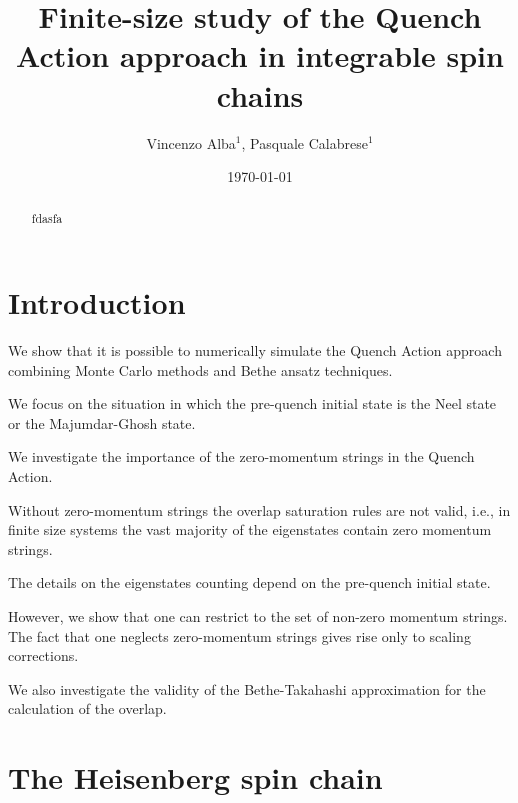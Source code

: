 \documentclass[11pt]{iopart}
\begin{document}
\setlength{\parindent}{0pt}


\title{Finite-size study of the Quench Action approach in integrable spin 
chains}

\author{Vincenzo Alba$^1$, Pasquale Calabrese$^1$}
\address{$^1$ International School for Advanced Studies (SISSA),
Via Bonomea 265, 34136, Trieste, Italy,
INFN, Sezione di Trieste}


\date{\today}



\begin{abstract} 


fdasfa
\end{abstract}

\maketitle

\section{Introduction}
\label{intro}

We show that it is possible to numerically simulate the Quench Action approach 
combining Monte Carlo methods and Bethe ansatz techniques. 

We focus on the situation in which the pre-quench initial state is the Neel 
state or the Majumdar-Ghosh state. 

We investigate the importance of the zero-momentum strings in the Quench Action. 

Without zero-momentum strings the overlap saturation rules are not valid, 
i.e., in finite size systems the vast majority of the eigenstates contain 
zero momentum strings. 

The details on the eigenstates counting depend on the pre-quench initial state. 

However, we show that one can restrict to the set of non-zero momentum strings. 
The fact that one neglects zero-momentum strings gives rise only to scaling 
corrections. 

We also investigate the validity of the Bethe-Takahashi approximation for the 
calculation of the overlap. 

\section{The Heisenberg spin chain}
\label{xxx-chain}
\end{document}
